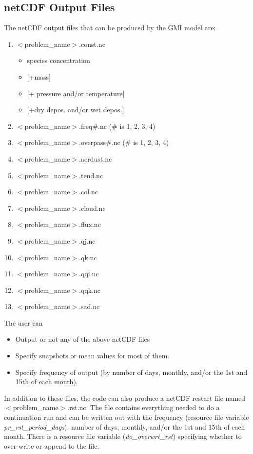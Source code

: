 \subsection{netCDF Output Files} \label{sec:netcdfout}
%
The netCDF output files that can be produced by the 
GMI model are:
%
\begin{enumerate}
\item $<$problem\_name$>$.const.nc
      \begin{itemize}
      \item species concentration
      \item $[$+mass$]$
      \item $[$+ pressure and/or temperature$]$
      \item $[$+dry depos. and/or wet depos.$]$
      \end{itemize}
\item $<$problem\_name$>$.freq\#.nc ($\#$ is 1, 2, 3, 4)
\item $<$problem\_name$>$.overpass\#.nc ($\#$ is 1, 2, 3, 4)
\item $<$problem\_name$>$.aerdust.nc
\item $<$problem\_name$>$.tend.nc
\item $<$problem\_name$>$.col.nc
\item $<$problem\_name$>$.cloud.nc
\item $<$problem\_name$>$.flux.nc
\item $<$problem\_name$>$.qj.nc
\item $<$problem\_name$>$.qk.nc
\item $<$problem\_name$>$.qqi.nc
\item $<$problem\_name$>$.qqk.nc
\item $<$problem\_name$>$.sad.nc
\end{enumerate}
%
The user can
\begin{itemize}
\item Output or not any of the above netCDF files
\item Specify snapshots or mean values for most of them.
\item Specify frequency of output 
      (by number of days, monthly, and/or the 1st and 15th of each month).
\end{itemize}
%
In addition to these files, the code can also produce
a netCDF restart file named $<$problem\_name$>$.rst.nc.
The file contains everything needed to do a continuation run and
can be written out with the frequency 
(resource file variable {\em pr\_rst\_period\_days}): number of days, monthly,
and/or the 1st and 15th of each month.
There is a resource file variable ({\em do\_overwrt\_rst}) specifying whether 
to over-write or append to the file.

